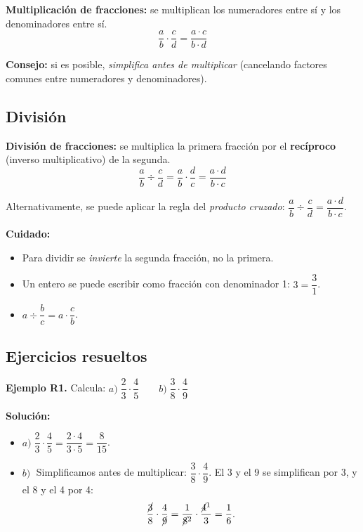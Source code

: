 \documentclass[12pt, letterpaper]{article}
\begin{document}
\begin{cuadroteoria}
  \textbf{Multiplicación de fracciones:} se multiplican los numeradores entre sí y los denominadores entre sí.
  $$\frac{a}{b} \cdot \frac{c}{d} = \frac{a \cdot c}{b \cdot d}$$

  \textbf{Consejo:} si es posible, \emph{simplifica antes de multiplicar} (cancelando factores comunes entre numeradores y denominadores).
\end{cuadroteoria}

\subsection{División}

\begin{cuadroteoria}
  \textbf{División de fracciones:} se multiplica la primera fracción por el \textbf{recíproco} (inverso multiplicativo) de la segunda.
  $$\frac{a}{b} \div \frac{c}{d} = \frac{a}{b} \cdot \frac{d}{c} = \frac{a \cdot d}{b \cdot c}$$

  Alternativamente, se puede aplicar la regla del \emph{producto cruzado}: $\dfrac{a}{b} \div \dfrac{c}{d} = \dfrac{a \cdot d}{b \cdot c}$.
\end{cuadroteoria}

\newpage %

\begin{cuadroadvertencia}
  \textbf{Cuidado:}
  \begin{itemize}[leftmargin=*]
    \item Para dividir se \emph{invierte} la segunda fracción, no la primera.
    \item Un entero se puede escribir como fracción con denominador 1: $3 = \dfrac{3}{1}$.
    \item $a \div \dfrac{b}{c} = a \cdot \dfrac{c}{b}$.
  \end{itemize}
\end{cuadroadvertencia}

\subsection{Ejercicios resueltos}

\textbf{Ejemplo R1.} Calcula: $a) \; \dfrac{2}{3} \cdot \dfrac{4}{5} \qquad b) \; \dfrac{3}{8} \cdot \dfrac{4}{9}$

\begin{cuadrosolucion}
  \textbf{Solución:}
  \begin{itemize}
    \item $a) \; \dfrac{2}{3} \cdot \dfrac{4}{5} = \dfrac{2 \cdot 4}{3 \cdot 5} = \dfrac{8}{15}$.
    \item $b) \;$ Simplificamos antes de multiplicar: $\dfrac{3}{8} \cdot \dfrac{4}{9}$. El 3 y el 9 se simplifican por 3, y el 8 y el 4 por 4:
          $$\frac{\cancel{3}}{8} \cdot \frac{4}{\cancel{9}} = \frac{1}{\cancel{8}^{2}} \cdot \frac{\cancel{4}^{1}}{3} = \frac{1}{6}.$$
  \end{itemize}
\end{cuadrosolucion}
\end{document}
